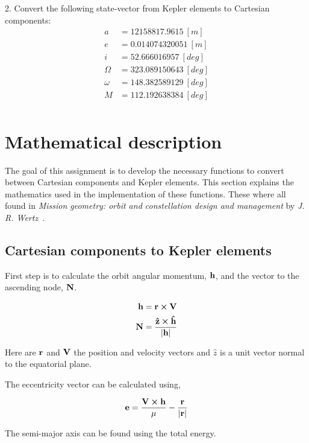     2. Convert the following state-vector from Kepler elements to Cartesian components:
    \begin{align*}
        a&=12158817.9615\ [m] \\
        e&=0.014074320051\ [m] \\
        i&=52.666016957\ [deg] \\
        \Omega&=323.089150643\ [deg] \\
        \omega&=148.382589129\ [deg] \\
        M&=112.192638384\ [deg] \\
    \end{align*}

    \section{Mathematical description}
    The goal of this assignment is to develop the necessary functions to convert between Cartesian components and Kepler elements. This section explains the mathematics used in the implementation of these functions. These where all found in \emph{Mission geometry: orbit and constellation design and management} by \emph{J. R. Wertz}~\cite{wertz2001mission}.

    \subsection{Cartesian components to Kepler elements}
    First step is to calculate the orbit angular momentum, $\mathbf{h}$, and the vector to the ascending node, $\mathbf{N}$. 

    \begin{align}
        \mathbf{h} &= \mathbf{r} \cross \mathbf{V} \\
        \mathbf{N} &= \frac{\mathbf{\hat{z}} \cross \mathbf{\hat{h}} }{\left| \mathbf{h} \right|}
    \end{align}

    Here are $\mathbf{r}$ and $\mathbf{V}$ the position and velocity vectors and $\hat{z}$ is a unit vector normal to the equatorial plane.

    The eccentricity vector can be calculated using,

    \begin{equation}
        \mathbf{e} = \frac{\mathbf{V} \cross \mathbf{h}}{\mu} - \frac{\mathbf{r}}{\left| \mathbf{r} \right|}
    \end{equation}

    The semi-major axis can be found using the total energy.


